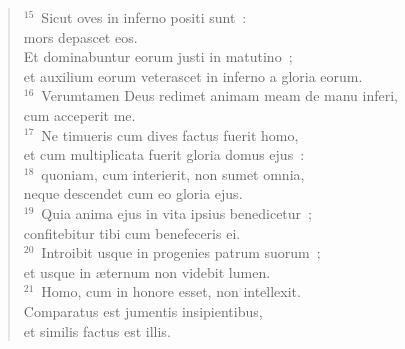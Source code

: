 \begin{flushleft}
\begin{verse}
${}^{15}$~Sicut oves in inferno positi sunt~:\\ mors depascet eos.\\ Et dominabuntur eorum justi in matutino~;\\ et auxilium eorum veterascet in inferno a gloria eorum.\\
${}^{16}$~Verumtamen Deus redimet animam meam de manu inferi,\\ cum acceperit me.\\
${}^{17}$~Ne timueris cum dives factus fuerit homo,\\ et cum multiplicata fuerit gloria domus ejus~:\\
${}^{18}$~quoniam, cum interierit, non sumet omnia,\\ neque descendet cum eo gloria ejus.\\
${}^{19}$~Quia anima ejus in vita ipsius benedicetur~;\\ confitebitur tibi cum benefeceris ei.\\
${}^{20}$~Introibit usque in progenies patrum suorum~;\\ et usque in \ae ternum non videbit lumen.\\
${}^{21}$~Homo, cum in honore esset, non intellexit.\\ Comparatus est jumentis insipientibus,\\ et similis factus est illis.\end{verse}\end{flushleft}


